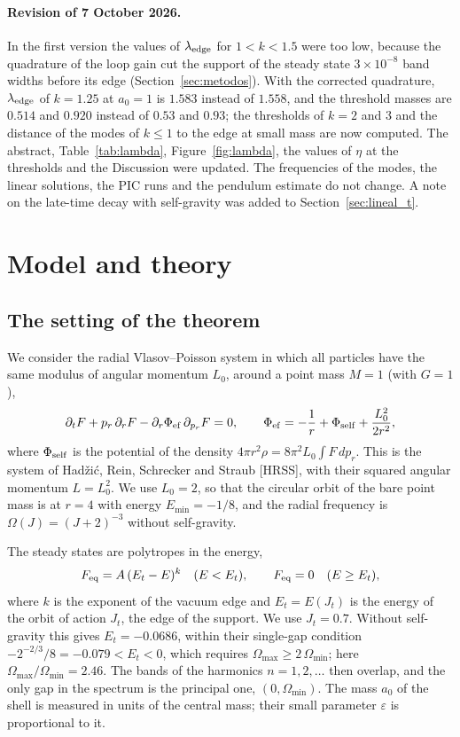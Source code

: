 \documentclass[11pt,a4paper]{article}
\begin{document}
\paragraph{Revision of 7 October 2026.} In the first version the values of $\lambda_{\rm edge}$ for
$1<k<1.5$ were too low, because the quadrature of the loop gain cut the support of the steady
state $3\times10^{-8}$ band widths before its edge (Section~\ref{sec:metodos}). With the corrected
quadrature, $\lambda_{\rm edge}$ of $k=1.25$ at $a_0=1$ is $1.583$ instead of $1.558$, and the
threshold masses are $0.514$ and $0.920$ instead of $0.53$ and $0.93$; the thresholds of $k=2$
and $3$ and the distance of the modes of $k\le1$ to the edge at small mass are now computed.
The abstract, Table~\ref{tab:lambda}, Figure~\ref{fig:lambda}, the values of $\eta$ at the
thresholds and the Discussion were updated. The frequencies of the modes, the linear
solutions, the PIC runs and the pendulum estimate do not change. A note on the late-time
decay with self-gravity was added to Section~\ref{sec:lineal_t}.

\tableofcontents

\section{Model and theory}
\label{sec:teoria}

\subsection{The setting of the theorem}

We consider the radial Vlasov--Poisson system in which all particles have the same
modulus of angular momentum $L_0$, around a point mass $M=1$ (with $G=1$),
\[
  \partial_tF+p_r\,\partial_rF-\partial_r\Phi_{\rm ef}\,\partial_{p_r}F=0,\qquad
  \Phi_{\rm ef}=-\frac1r+\Phi_{\rm self}+\frac{L_0^2}{2r^2},
\]
where $\Phi_{\rm self}$ is the potential of the density $4\pi r^2\rho=8\pi^2L_0\int F\,dp_r$.
This is the system of Hadžić, Rein, Schrecker and Straub [HRSS], with their squared
angular momentum $L=L_0^2$. We use $L_0=2$, so that the circular orbit of the bare point
mass is at $r=4$ with energy $E_{\min}=-1/8$, and the radial frequency is
$\Omega(J)=(J+2)^{-3}$ without self-gravity.

The steady states are polytropes in the energy,
\[
  F_{\rm eq}=A\,(E_t-E)^k\quad(E<E_t),\qquad F_{\rm eq}=0\quad(E\ge E_t),
\]
where $k$ is the exponent of the vacuum edge and $E_t=E(J_t)$ is the energy of the orbit
of action $J_t$, the edge of the support. We use $J_t=0.7$. Without self-gravity this gives
$E_t=-0.0686$, within their single-gap condition $-2^{-2/3}/8=-0.079<E_t<0$, which
requires $\Omega_{\max}\ge2\,\Omega_{\min}$; here $\Omega_{\max}/\Omega_{\min}=2.46$. The bands of the
harmonics $n=1,2,\dots$ then overlap, and the only gap in the spectrum is the principal
one, $(0,\Omega_{\min})$. The mass $a_0$ of the shell is measured in units of the central
mass; their small parameter $\varepsilon$ is proportional to it.
\end{document}
